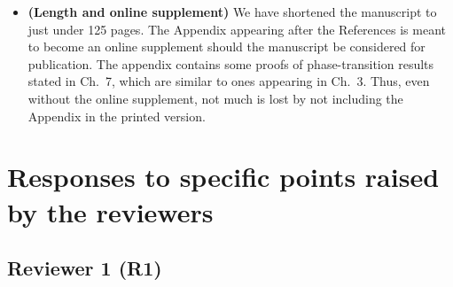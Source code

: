 \documentclass[11pt]{article}
\begin{document}
\begin{itemize}
 \item {\bf (Length and online supplement)} We have shortened the manuscript to just under 125 pages. The Appendix appearing after the 
 References is meant to become an online supplement should the manuscript be considered for publication.  The appendix contains some proofs
 of phase-transition results stated in Ch.\ 7, which are similar to ones appearing in Ch.\ 3.%
 Thus, even without the online supplement, not much is lost by
 not including the Appendix in the printed version. 

  
 \end{itemize}
 
 
 \section{Responses to specific points raised by the reviewers}
 
 \subsection{Reviewer 1 (R1)}
 
\end{document}
